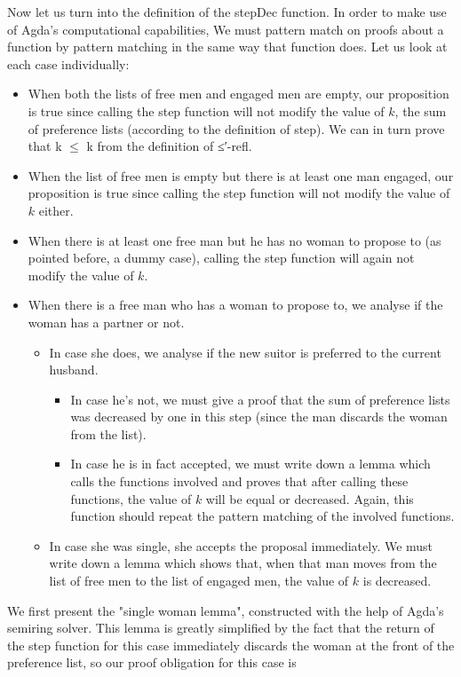 {Now let us turn into the definition of the stepDec function. In order to make use of Agda's computational capabilities, We must pattern match on proofs about a function by pattern matching in the same way that function does. Let us look at each case individually:

\begin{itemize}
  \item When both the lists of free men and engaged men are empty, our proposition is true since calling the step function will not modify the value of $k$, the sum of preference lists (according to the definition of step). We can in turn prove that k $\le$ k from the definition of ≤′-refl.
  \item When the list of free men is empty but there is at least one man engaged, our proposition is true since calling the step function will not modify the value of $k$ either.
  \item When there is at least one free man but he has no woman to propose to (as pointed before, a dummy case), calling the step function will again not modify the value of $k$.
  \item When there is a free man who has a woman to propose to, we analyse if the woman has a partner or not.
    \begin{itemize}
      \item In case she does, we analyse if the new suitor is preferred to the current husband.
        \begin{itemize}
          \item In case he's not, we must give a proof that the sum of preference lists was decreased by one in this step (since the man discards the woman from the list).
          \item In case he is in fact accepted, we must write down a lemma which calls the functions involved and proves that after calling these functions, the value of $k$ will be equal or decreased. Again, this function should repeat the pattern matching of the involved functions.
        \end{itemize}
      \item In case she was single, she accepts the proposal immediately. We must write down a lemma which shows that, when that man moves from the list of free men to the list of engaged men, the value of $k$ is decreased.
    \end{itemize}
\end{itemize}

We first present the "single woman lemma", constructed with the help of Agda's semiring solver. This lemma is greatly simplified by the fact that the return of the step function for this case immediately discards the woman at the front of the preference list, so our proof obligation for this case is

}

